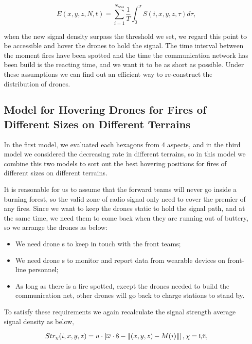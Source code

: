 \documentclass[13pt]{ctexart} %
\begin{document}
\begin{equation}
    E(x,y,z,N,t)=\sum_{i=1}^{N_{\text{SSA}}}\frac{1}{T}\int_{0}^{T}S(i,x,y,z,\tau)d\tau,
\end{equation}

when the new signal density surpass the threshold we set, we regard this point to be accessible and hover the drones to hold the signal. The time interval between the moment fires have been spotted and the time the communication network has been build is the reacting time, and we want it to be as short as possible. Under these assumptions we can find out an efficient way to re-construct the distribution of drones.

\subsection{Model for Hovering Drones for Fires of Different Sizes on Different Terrains}
In the first model, we evaluated each hexagons from 4 aspects, and in the third model we considered the decreasing rate in different terrains, so in this model we combine this two models to sort out the best hovering positions for fires of different sizes on different terrains.

It is reasonable for us to assume that the forward teams will never go inside a burning forest, so the valid zone of radio signal only need to cover the premier of any fires. Since we want to keep the drones static to hold the signal path, and at the same time, we need them to come back when they are running out of buttery, so we arrange the drones as below:

\begin{itemize}
    \item We need drone \uppercase\expandafter{}s to keep in touch with the front teams;
   \item We need drone \uppercase\expandafter{}s to monitor and report data from wearable devices on front-line personnel;
    \item As long as there is a fire spotted, except the drones needed to build the communication net, other drones will go back to charge stations to stand by.
\end{itemize}

To satisfy these requirements we again recalculate the signal strength average signal density as below,

\begin{equation}
    Str_{\chi}(i,x,y,z)
    =u\cdot\left[
            \overline{\omega}\cdot 8
            -\lVert
                (x,y,z)-M(i)
            \rVert
        \right],
    \chi=\text{\small\uppercase\expandafter{\romannumeral1}}\text{\small ,}
    \text{\small\uppercase\expandafter{\romannumeral2}}\text{\small ,}
\end{equation}
\end{document}
